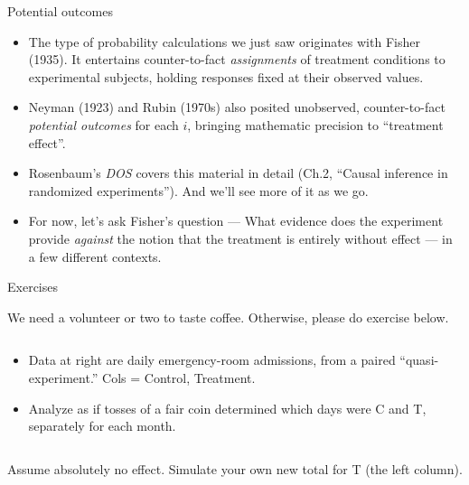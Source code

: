 \begin{frame}{Potential outcomes}
  
  \begin{itemize}[<+->]
  \item The type of probability calculations we just saw originates
    with Fisher (1935). It entertains counter-to-fact
    \textit{assignments} of treatment conditions to experimental
    subjects, holding responses fixed at their observed values.
  \item Neyman (1923) and Rubin (1970s) also posited
    unobserved, counter-to-fact \textit{potential outcomes} for each
    $i$, bringing mathematic precision to ``treatment effect''.
   \item Rosenbaum's \textit{DOS} covers this material in detail
       (Ch.2, ``Causal inference in randomized experiments''). And we'll
       see more of it as we go.
   \item For now, let's ask Fisher's question --- What evidence does
     the experiment provide \textit{against} the notion that the
     treatment is entirely without effect --- in a few different contexts.
  \end{itemize}

\end{frame}

\begin{frame}{Exercises}

 We need a volunteer or two to taste coffee. Otherwise, please do exercise
 below.
 
  \begin{columns}
    \begin{Column}
  \begin{itemize}
  \item Data at right are daily emergency-room admissions, from a paired
    ``quasi-experiment.'' Cols = Control, Treatment. 
  \item  Analyze as if tosses of a fair coin determined which days
    were C and T, separately for each month.
 \end{itemize}      
    \end{Column}
    \begin{Column}
    \end{Column}
  \end{columns}  

Assume absolutely no effect. Simulate your own new total for T (the
    left column).
   
\end{frame}
